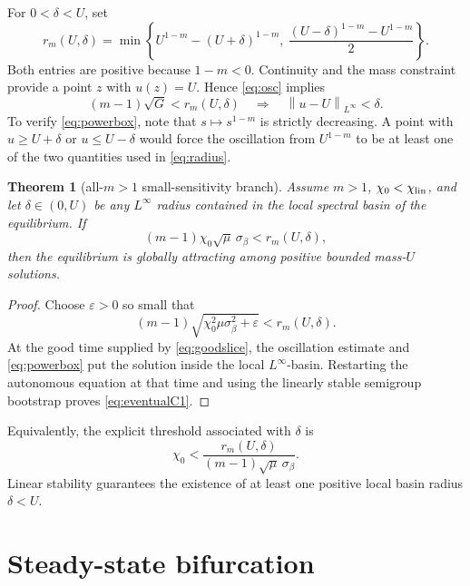\documentclass[11pt]{article}
\newcommand{\norm}[1]{\left\lVert #1\right\rVert}
\newtheorem{theorem}{Theorem}
\begin{document}
For \(0<\delta<U\), set
\begin{equation}
 r_m(U,\delta)=
 \min\left\{
 U^{1-m}-(U+\delta)^{1-m},\
 \frac{(U-\delta)^{1-m}-U^{1-m}}2
 \right\}.                                             \label{eq:radius}
\end{equation}
Both entries are positive because \(1-m<0\).  Continuity and the mass
constraint provide a point \(z\) with \(u(z)=U\).  Hence
\eqref{eq:osc} implies
\begin{equation}
 (m-1)\sqrt G<r_m(U,\delta)
 \quad\Longrightarrow\quad
 \norm{u-U}_{L^\infty}<\delta.                         \label{eq:powerbox}
\end{equation}
To verify \eqref{eq:powerbox}, note that \(s\mapsto s^{1-m}\) is strictly
decreasing.  A point with \(u\ge U+\delta\) or \(u\le U-\delta\) would force
the oscillation from \(U^{1-m}\) to be at least one of the two quantities
used in \eqref{eq:radius}.

\begin{theorem}[all-\(m>1\) small-sensitivity branch]
Assume \(m>1\), \(\chi_0<\chi_{\rm lin}\), and let
\(\delta\in(0,U)\) be any \(L^\infty\) radius contained in the local
spectral basin of the equilibrium.  If
\begin{equation}
 (m-1)\chi_0\sqrt\mu\,\sigma_\beta<r_m(U,\delta),       \label{eq:small}
\end{equation}
then the equilibrium is globally attracting among positive bounded
mass-\(U\) solutions.
\end{theorem}

\begin{proof}
Choose \(\varepsilon>0\) so small that
\[
 (m-1)\sqrt{\chi_0^2\mu\sigma_\beta^2+\varepsilon}
 <r_m(U,\delta).
\]
At the good time supplied by \eqref{eq:goodslice}, the oscillation estimate
and \eqref{eq:powerbox} put the solution inside the local
\(L^\infty\)-basin.  Restarting the autonomous equation at that time and
using the linearly stable semigroup bootstrap proves
\eqref{eq:eventualC1}.
\end{proof}

Equivalently, the explicit threshold associated with \(\delta\) is
\[
 \chi_0<
 \frac{r_m(U,\delta)}
 {(m-1)\sqrt\mu\,\sigma_\beta}.
\]
Linear stability guarantees the existence of at least one positive local
basin radius \(\delta<U\).

\section{Steady-state bifurcation}
\end{document}

